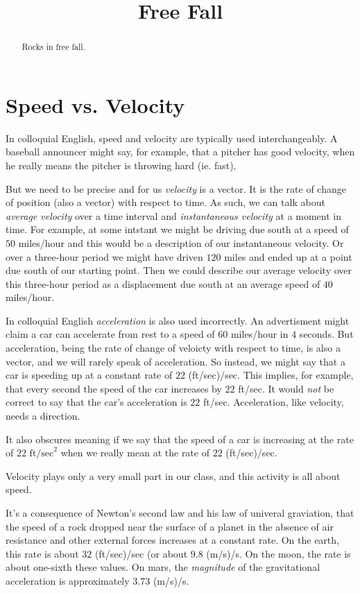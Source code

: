 \documentclass{ximera}
\title{Free Fall}
\begin{document}
\begin{abstract}
Rocks in free fall.
\end{abstract}
\maketitle


\section{Speed vs. Velocity}

In colloquial English, speed and velocity are typically used interchangeably. A baseball announcer might say, for example, that a pitcher has good velocity, when he really means the pitcher is throwing hard (ie. fast).

But we need to be precise and for us \emph{velocity} is a vector. It is the rate of change of position (also a vector) with respect to time. As such, we can talk about \emph{average velocity} over a time interval and \emph{instantaneous velocity} at a moment in time. For example, at some intstant we might be driving due south at a speed of $50$ miles/hour and this would be a description of our instantaneous velocity. Or over a three-hour period we might have driven $120$ miles and ended up at a point due south of our starting point. Then we could describe our average velocity over this three-hour period as a displacement due south at an average speed of $40$ miles/hour.

In colloquial English \emph{acceleration} is also used incorrectly. An advertisment might claim a car can accelerate from rest to a speed of $60$ miles/hour in $4$ seconds. But acceleration, being the rate of change of veloicty with respect to time, is also a vector, and we will rarely speak of acceleration. So instead, we might say that a car is speeding up at a constant rate of $22$ (ft/sec)/sec. This implies, for example, that every second the speed of the car increases by $22$ ft/sec. It would \emph{not} be correct to say that the car's acceleration is $22$ ft/sec. Acceleration, like velocity, needs a direction.

It also obscures meaning if we say that the speed of a car is increasing at the rate of $22\text{ ft/sec}^2$ when we really mean at the rate of $22$ (ft/sec)/sec.

Velocity plays only a very small part in our class, and this activity is all about speed.

It's a consequence of Newton's second law and his law of univeral graviation, that the speed of a rock dropped near the surface of a planet in the absence of air resistance and other external forces increases at a constant rate. On the earth, this rate is about $32$ (ft/sec)/sec (or about $9.8$ (m/s)/s. On the moon, the rate is about one-sixth these values. On mars, the \emph{magnitude} of the gravitational acceleration is approximately $3.73$ (m/s)/s.
\end{document}
